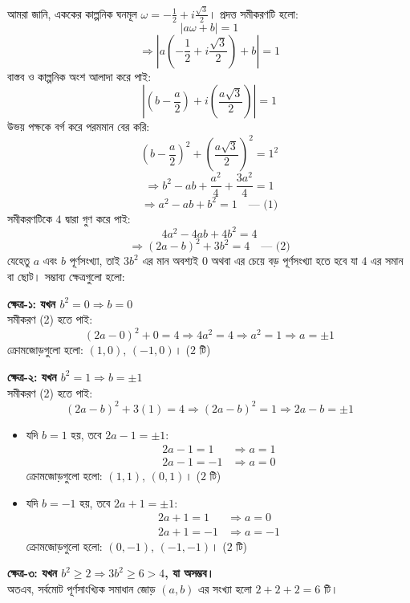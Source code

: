 \documentclass[12pt, a4paper]{article}
\begin{document}
\begin{tcolorbox}[solutionbox={সমাধান (Solution)}]
    \noindent
    আমরা জানি, এককের কাল্পনিক ঘনমূল $\omega = -\frac{1}{2} + i\frac{\sqrt{3}}{2}$। প্রদত্ত সমীকরণটি হলো:
    \[ |a\omega + b| = 1 \]
    \[ \Rightarrow \left|a\left(-\frac{1}{2} + i\frac{\sqrt{3}}{2}\right) + b\right| = 1 \]
    বাস্তব ও কাল্পনিক অংশ আলাদা করে পাই:
    \[ \left|\left(b - \frac{a}{2}\right) + i\left(\frac{a\sqrt{3}}{2}\right)\right| = 1 \]
    উভয় পক্ষকে বর্গ করে পরমমান বের করি:
    \[ \left(b - \frac{a}{2}\right)^2 + \left(\frac{a\sqrt{3}}{2}\right)^2 = 1^2 \]
    \[ \Rightarrow b^2 - ab + \frac{a^2}{4} + \frac{3a^2}{4} = 1 \]
    \[ \Rightarrow a^2 - ab + b^2 = 1 \quad \text{--- (1)} \]
    সমীকরণটিকে $4$ দ্বারা গুণ করে পাই:
    \[ 4a^2 - 4ab + 4b^2 = 4 \]
    \[ \Rightarrow (2a - b)^2 + 3b^2 = 4 \quad \text{--- (2)} \]
    যেহেতু $a$ এবং $b$ পূর্ণসংখ্যা, তাই $3b^2$ এর মান অবশ্যই $0$ অথবা এর চেয়ে বড় পূর্ণসংখ্যা হতে হবে যা $4$ এর সমান বা ছোট। সম্ভাব্য ক্ষেত্রগুলো হলো:
    
    \vspace{0.5em}
    \textbf{ক্ষেত্র-১: যখন $b^2 = 0 \Rightarrow b = 0$} \\
    সমীকরণ (2) হতে পাই:
    \[ (2a - 0)^2 + 0 = 4 \Rightarrow 4a^2 = 4 \Rightarrow a^2 = 1 \Rightarrow a = \pm 1 \]
    ক্রোমজোড়গুলো হলো: $(1, 0)$, $(-1, 0)$। ($2$ টি)
    
    \vspace{0.5em}
    \textbf{ক্ষেত্র-২: যখন $b^2 = 1 \Rightarrow b = \pm 1$} \\
    সমীকরণ (2) হতে পাই:
    \[ (2a - b)^2 + 3(1) = 4 \Rightarrow (2a - b)^2 = 1 \Rightarrow 2a - b = \pm 1 \]
    \begin{itemize}
        \item যদি $b = 1$ হয়, তবে $2a - 1 = \pm 1$:
        \begin{align*}
            2a - 1 = 1 &\Rightarrow a = 1 \\
            2a - 1 = -1 &\Rightarrow a = 0
        \end{align*}
        ক্রোমজোড়গুলো হলো: $(1, 1)$, $(0, 1)$। ($2$ টি)
        \item যদি $b = -1$ হয়, তবে $2a + 1 = \pm 1$:
        \begin{align*}
            2a + 1 = 1 &\Rightarrow a = 0 \\
            2a + 1 = -1 &\Rightarrow a = -1
        \end{align*}
        ক্রোমজোড়গুলো হলো: $(0, -1)$, $(-1, -1)$। ($2$ টি)
    \end{itemize}
    
    \vspace{0.5em}
    \textbf{ক্ষেত্র-৩: যখন $b^2 \geq 2 \Rightarrow 3b^2 \geq 6 > 4$, যা অসম্ভব।} \\
    অতএব, সর্বমোট পূর্ণসাংখ্যিক সমাধান জোড় $(a, b)$ এর সংখ্যা হলো $2 + 2 + 2 = 6$ টি।
\end{tcolorbox}
\end{document}
